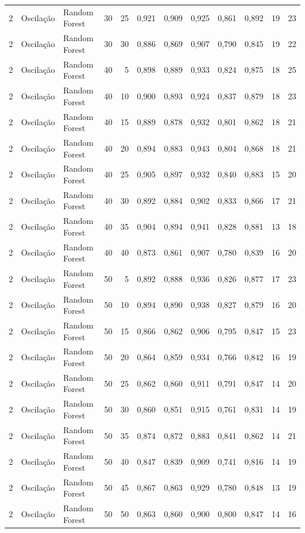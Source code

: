 \begin{longtable}{@{}rllrrrrrrrrr@{}}
2 & Oscilação & Random Forest & 30 & 25 & 0,921 & 0,909 & 0,925 & 0,861 & 0,892 & 19 & 23 \\
2 & Oscilação & Random Forest & 30 & 30 & 0,886 & 0,869 & 0,907 & 0,790 & 0,845 & 19 & 22 \\
2 & Oscilação & Random Forest & 40 & 5 & 0,898 & 0,889 & 0,933 & 0,824 & 0,875 & 18 & 25 \\
2 & Oscilação & Random Forest & 40 & 10 & 0,900 & 0,893 & 0,924 & 0,837 & 0,879 & 18 & 23 \\
2 & Oscilação & Random Forest & 40 & 15 & 0,889 & 0,878 & 0,932 & 0,801 & 0,862 & 18 & 21 \\
2 & Oscilação & Random Forest & 40 & 20 & 0,894 & 0,883 & 0,943 & 0,804 & 0,868 & 18 & 21 \\
2 & Oscilação & Random Forest & 40 & 25 & 0,905 & 0,897 & 0,932 & 0,840 & 0,883 & 15 & 20 \\
2 & Oscilação & Random Forest & 40 & 30 & 0,892 & 0,884 & 0,902 & 0,833 & 0,866 & 17 & 21 \\
2 & Oscilação & Random Forest & 40 & 35 & 0,904 & 0,894 & 0,941 & 0,828 & 0,881 & 13 & 18 \\
2 & Oscilação & Random Forest & 40 & 40 & 0,873 & 0,861 & 0,907 & 0,780 & 0,839 & 16 & 20 \\
2 & Oscilação & Random Forest & 50 & 5 & 0,892 & 0,888 & 0,936 & 0,826 & 0,877 & 17 & 23 \\
2 & Oscilação & Random Forest & 50 & 10 & 0,894 & 0,890 & 0,938 & 0,827 & 0,879 & 16 & 20 \\
2 & Oscilação & Random Forest & 50 & 15 & 0,866 & 0,862 & 0,906 & 0,795 & 0,847 & 15 & 23 \\
2 & Oscilação & Random Forest & 50 & 20 & 0,864 & 0,859 & 0,934 & 0,766 & 0,842 & 16 & 19 \\
2 & Oscilação & Random Forest & 50 & 25 & 0,862 & 0,860 & 0,911 & 0,791 & 0,847 & 14 & 20 \\
2 & Oscilação & Random Forest & 50 & 30 & 0,860 & 0,851 & 0,915 & 0,761 & 0,831 & 14 & 19 \\
2 & Oscilação & Random Forest & 50 & 35 & 0,874 & 0,872 & 0,883 & 0,841 & 0,862 & 14 & 21 \\
2 & Oscilação & Random Forest & 50 & 40 & 0,847 & 0,839 & 0,909 & 0,741 & 0,816 & 14 & 19 \\
2 & Oscilação & Random Forest & 50 & 45 & 0,867 & 0,863 & 0,929 & 0,780 & 0,848 & 13 & 19 \\
2 & Oscilação & Random Forest & 50 & 50 & 0,863 & 0,860 & 0,900 & 0,800 & 0,847 & 14 & 16 \\

\end{longtable}
